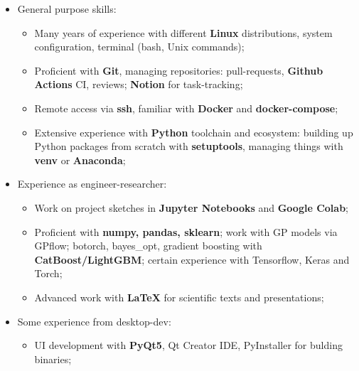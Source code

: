 \documentclass[12pt,a4paper,roman]{moderncv}
\begin{document}
 \begin{itemize}
 \item General purpose skills: \newline
    \begin{itemize}
        \item Many years of experience with different \textbf{Linux} distributions, system configuration, terminal (bash, Unix commands); \newline
        \item Proficient with \textbf{Git}, managing repositories: pull-requests,  \textbf{Github Actions} CI, reviews; \textbf{Notion} for task-tracking; \newline
        \item Remote access via \textbf{ssh}, familiar with \textbf{Docker} and \textbf{docker-compose}; \newline
        \item Extensive experience with \textbf{Python} toolchain and ecosystem: building up Python packages from scratch with \textbf{setuptools},
managing things with \textbf{venv} or \textbf{Anaconda}; \newline
    \end{itemize}    
 \item Experience as engineer-researcher:\newline
    \begin{itemize}
        \item Work on project sketches in \textbf{Jupyter Notebooks} and \textbf{Google Colab}; \newline
        \item Proficient with \textbf{numpy, pandas, sklearn}; work with GP models via GPflow; botorch, bayes\_opt, 
        gradient boosting with \textbf{CatBoost/LightGBM}; certain experience with Tensorflow, Keras and Torch; \newline
        \item Advanced work with \textbf{LaTeX} for scientific texts and presentations; \newline
    \end{itemize} 
 \item Some experience from desktop-dev:\newline
    \begin{itemize}
        \item UI development with \textbf{PyQt5}, Qt Creator IDE, PyInstaller for bulding binaries; \newline

\end{itemize}
\end{itemize}
\end{document}
